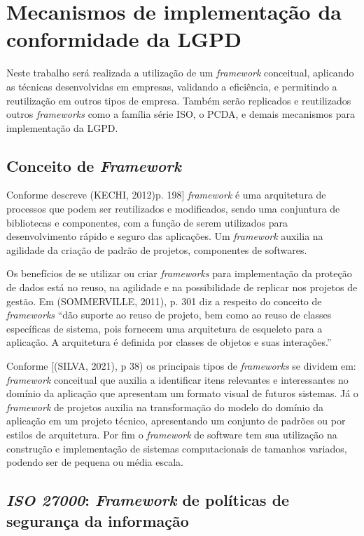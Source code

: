 \documentclass[
	12pt,				%
	openright,			%
	oneside,			%
	a4paper,			%
	english,			%
	french,				%
	spanish,			%
	brazil,				%
	]{abntex2}
\begin{document}
\section{Mecanismos de implementação da conformidade da LGPD}

Neste trabalho será realizada a utilização de um \textit{framework} conceitual, aplicando as técnicas desenvolvidas em empresas, validando a eficiência, e permitindo a reutilização em outros tipos de empresa. Também serão replicados e reutilizados outros \textit{frameworks} como a família série ISO, o PCDA, e demais mecanismos para implementação da LGPD. 

\subsection{Conceito de \textit{Framework}}

Conforme descreve (KECHI, 2012)p. 198] \textit{framework} é uma arquitetura de processos que podem ser reutilizados e modificados, sendo uma conjuntura de bibliotecas e componentes, com a função de serem utilizados para desenvolvimento rápido e seguro das aplicações. Um \textit{framework} auxilia na agilidade da criação de padrão de projetos, componentes de softwares.

Os benefícios de se utilizar ou criar \textit{frameworks} para implementação da proteção de dados está no reuso, na agilidade e na possibilidade de replicar nos projetos de gestão. Em (SOMMERVILLE, 2011), p. 301 diz a respeito do conceito de \textit{frameworks} “dão suporte ao reuso de projeto, bem como ao reuso de classes específicas de sistema, pois fornecem uma arquitetura de esqueleto para a aplicação. A arquitetura é definida por classes de objetos e suas interações.” 

Conforme [(SILVA, 2021), p 38) os principais tipos de \textit{frameworks} se dividem em: \textit{framework} conceitual que auxilia a identificar itens relevantes e interessantes no domínio da aplicação que apresentam um formato visual de futuros sistemas. Já o \textit{framework} de projetos auxilia na transformação do modelo do domínio da aplicação em um projeto técnico, apresentando um conjunto de padrões ou por estilos de arquitetura. Por fim o \textit{framework} de software tem sua utilização na construção e implementação de sistemas computacionais de tamanhos variados, podendo ser de pequena ou média escala.

\subsection{\textit{ISO 27000}: \textit{Framework} de políticas de segurança da informação}
\end{document}
